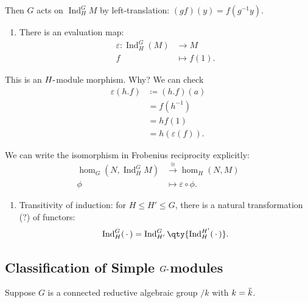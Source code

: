 Then \(G\) acts on \(\operatorname{Ind}_H^G M\) by left-translation:
\((gf)(y) = f(g^{-1} y)\).

\begin{enumerate}
\def\labelenumi{\arabic{enumi}.}
\setcounter{enumi}{6}
\tightlist
\item
  There is an evaluation map:
  \begin{align*}  
  \varepsilon: \operatorname{Ind}_H^G(M) &\to M \\ 
  f&\mapsto f(1)
  .\end{align*}
\end{enumerate}

This is an \(H{\hbox{-}}\)module morphism. Why? We can check
\begin{align*}  
\varepsilon(h.f) 
&\coloneqq(h.f)(a) \\
&= f(h^{-1} ) \\
&= hf(1) \\
&= h(\varepsilon(f))
.\end{align*}

We can write the isomorphism in Frobenius reciprocity explicitly:
\begin{align*}  
\hom_G(N, \operatorname{Ind}_H^G M) &\xrightarrow{\cong} \hom_H(N, M) \\
\phi & \mapsto \varepsilon\circ \phi
.\end{align*}

\begin{enumerate}
\def\labelenumi{\arabic{enumi}.}
\setcounter{enumi}{7}
\tightlist
\item
  Transitivity of induction: for \(H\leq H' \leq G\), there is a natural
  transformation (?) of functors:
  \begin{align*}  
  \operatorname{Ind}_H^G({\,\cdot\,}) = \operatorname{Ind}_{H'}^G\qty{\operatorname{Ind}_H^{H'}({\,\cdot\,}) }
  .\end{align*}
\end{enumerate}


\hypertarget{classification-of-simple-ghbox-modules}{%
\subsection{\texorpdfstring{Classification of Simple
\(G{\hbox{-}}\)modules}{Classification of Simple G\{\textbackslash hbox\{-\}\}modules}}\label{classification-of-simple-ghbox-modules}}

Suppose \(G\) is a connected reductive algebraic group \(/k\) with
\(k = \mkern 1.5mu\overline{\mkern-1.5muk\mkern-1.5mu}\mkern 1.5mu\).

